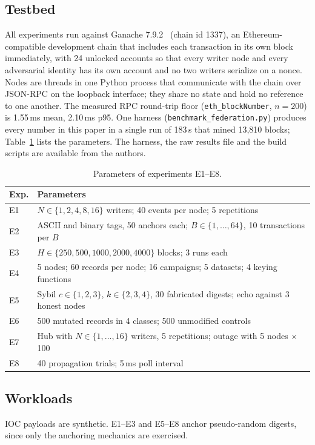 \documentclass[conference]{IEEEtran}
\begin{document}
\subsection{Testbed}
All experiments run against Ganache 7.9.2~\cite{ref19} (chain id 1337), an Ethereum-compatible development chain that includes each transaction in its own block immediately, with 24 unlocked accounts so that every writer node and every adversarial identity has its own account and no two writers serialize on a nonce. Nodes are threads in one Python process that communicate with the chain over JSON-RPC on the loopback interface; they share no state and hold no reference to one another. The measured RPC round-trip floor (\texttt{eth\_blockNumber}, $n=200$) is 1.55\,ms mean, 2.10\,ms p95. One harness (\texttt{benchmark\_federation.py}) produces every number in this paper in a single run of 183\,s that mined 13,810 blocks; Table~\ref{tab:params} lists the parameters. The harness, the raw results file and the build scripts are available from the authors.

\begin{table}[!t]
\caption{Parameters of experiments E1--E8.}
\label{tab:params}
\centering
\scriptsize
\setlength{\tabcolsep}{3pt}
\begin{tabular}{@{}lp{}@{}}
\toprule
Exp. & Parameters \\
\midrule
E1 & $N\in\{1,2,4,8,16\}$ writers; 40 events per node; 5 repetitions \\
E2 & ASCII and binary tags, 50 anchors each; $B\in\{1,\dots,64\}$, 10 transactions per $B$ \\
E3 & $H\in\{250,500,1000,2000,4000\}$ blocks; 3 runs each \\
E4 & 5 nodes; 60 records per node; 16 campaigns; 5 datasets; 4 keying functions \\
E5 & Sybil $c\in\{1,2,3\}$, $k\in\{2,3,4\}$, 30 fabricated digests; echo against 3 honest nodes \\
E6 & 500 mutated records in 4 classes; 500 unmodified controls \\
E7 & Hub with $N\in\{1,\dots,16\}$ writers, 5 repetitions; outage with 5 nodes $\times$ 100 \\
E8 & 40 propagation trials; 5\,ms poll interval \\
\bottomrule
\end{tabular}
\end{table}

\subsection{Workloads}
IOC payloads are synthetic. E1--E3 and E5--E8 anchor pseudo-random digests, since only the anchoring mechanics are exercised.
\end{document}
